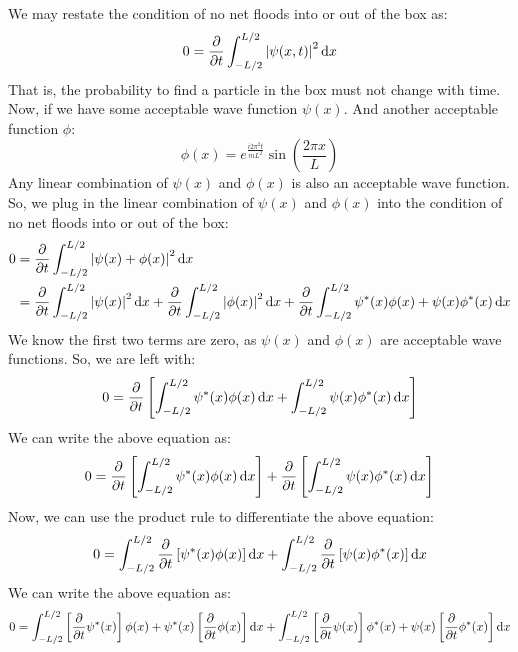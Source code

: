 \documentclass[12pt]{article}
\begin{document}
\subsection{}
We may restate the condition of no net floods into or out of the box as:
\begin{equation}
  0=\pdv{t}\int_{-L / 2}^{L / 2} \abs{\psi(x, t)}^{2} \dd{x}
\end{equation}
That is, the probability to find a particle in the box must not change with time.
Now, if we have some acceptable wave function $\psi(x)$.
And another acceptable function $\phi $:
\begin{equation}
  \phi (x)=e^{\frac{i2\pi^2t}{mL^2}}\sin\left(\frac{2\pi x}{L}\right)
\end{equation}
Any linear combination of $\psi(x)$ and $\phi(x)$ is also an acceptable wave function.
So, we plug in the linear combination of $\psi(x)$ and $\phi(x)$ into the condition of no net floods into or out of the box:
\begin{equation}
  \begin{aligned}
    0&=\pdv{t}\int_{-L / 2}^{L / 2} \abs{\psi(x)+\phi(x)}^{2} \dd{x}\\
    &=\pdv{t}\int_{-L / 2}^{L / 2} \abs{\psi(x)}^{2} \dd{x}+\pdv{t}\int_{-L / 2}^{L / 2} \abs{\phi(x)}^{2} \dd{x}+\pdv{t}\int_{-L / 2}^{L / 2}\psi^*(x)\phi(x)+\psi(x)\phi^*(x) \dd{x}\\
\end{aligned}
\end{equation}
We know the first two terms are zero, as $\psi(x)$ and $\phi(x)$ are acceptable wave functions. So, we are left with:
\begin{equation}
  0=\pdv{t}\left[\int_{-L / 2}^{L / 2} \psi^*(x)\phi(x)\dd{x}+\int_{-L / 2}^{L / 2} \psi(x)\phi^*(x) \dd{x}\right]
\end{equation}
We can write the above equation as:
\begin{equation}
  0=\pdv{t}\left[\int_{-L / 2}^{L / 2} \psi^*(x)\phi(x)\dd{x}\right]+\pdv{t}\left[\int_{-L / 2}^{L / 2} \psi(x)\phi^*(x) \dd{x}\right]
\end{equation}
Now, we can use the product rule to differentiate the above equation:
\begin{equation}
  0=\int_{-L / 2}^{L / 2} \pdv{t}\left[\psi^*(x)\phi(x)\right]\dd{x}+\int_{-L / 2}^{L / 2} \pdv{t}\left[\psi(x)\phi^*(x)\right] \dd{x}
\end{equation}
We can write the above equation as:
\begin{equation}
  0=\int_{-L / 2}^{L / 2} \left[\pdv{t}\psi^*(x)\right]\phi(x)+\psi^*(x)\left[\pdv{t}\phi(x)\right]\dd{x}+\int_{-L / 2}^{L / 2} \left[\pdv{t}\psi(x)\right]\phi^*(x)+\psi(x)\left[\pdv{t}\phi^*(x)\right] \dd{x}
\end{equation}
\end{document}
